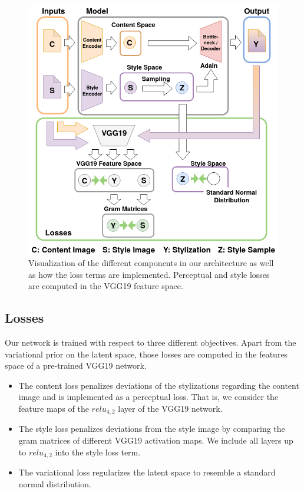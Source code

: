 \documentclass[10pt,twocolumn,letterpaper]{article}
\begin{document}
\begin{figure}
\centering
\includegraphics[width=0.9\linewidth]{pipeline_reduced_semi_verbose.png}
\caption{Visualization of the different components in our architecture as well as how the loss terms are implemented. Perceptual and style losses are computed in the VGG19 feature space.}
\label{fig:model}
\end{figure}
	
	
\subsection{Losses}

Our network is trained with respect to three different objectives. Apart from the variational prior on the latent space, those losses are computed in the features space of a pre-trained VGG19 network.
\begin{itemize}
	\item The content loss penalizes deviations of the stylizations regarding the content image and is implemented as a perceptual loss. That is, we consider the feature maps of the $relu_{4,2}$ layer of the VGG19 network.
	\item The style loss penalizes deviations from the style image by comparing the gram matrices of different VGG19 activation maps. We include all layers up to $relu_{4,2}$ into the style loss term.
	\item The variational loss regularizes the latent space to resemble a standard normal distribution.
\end{itemize}
\end{document}

